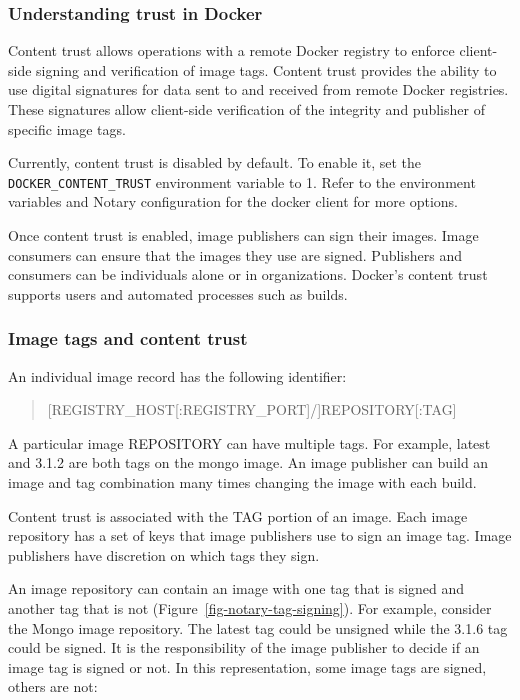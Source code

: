 \subsubsection{Understanding trust in Docker}
Content trust allows operations with a remote Docker registry to enforce
client-side signing and verification of image tags. Content trust provides
the ability to use digital signatures for data sent to and received from
remote Docker registries. These signatures allow client-side verification
of the integrity and publisher of specific image tags.

Currently, content trust is disabled by default. To enable it, set the
{\tt DOCKER\_CONTENT\_TRUST} environment variable to 1. Refer to the environment
variables and Notary configuration for the docker client for more options.

Once content trust is enabled, image publishers can sign their images.
Image consumers can ensure that the images they use are signed. Publishers
and consumers can be individuals alone or in organizations. Docker’s
content trust supports users and automated processes such as builds.

\subsubsection{Image tags and content trust}
An individual image record has the following identifier:

\begin{quote}
[REGISTRY\_HOST[:REGISTRY\_PORT]/]REPOSITORY[:TAG]
\end{quote}

A particular image REPOSITORY can have multiple tags. For example, latest
and 3.1.2 are both tags on the mongo image. An image publisher can build an
image and tag combination many times changing the image with each build.

Content trust is associated with the TAG portion of an image. Each image
repository has a set of keys that image publishers use to sign an image
tag. Image publishers have discretion on which tags they sign.

An image repository can contain an image with one tag that is signed and
another tag that is not (Figure~\ref{fig-notary-tag-signing}). For example, 
consider the Mongo image repository.
The latest tag could be unsigned while the 3.1.6 tag could be signed. It is
the responsibility of the image publisher to decide if an image tag is
signed or not. In this representation, some image tags are signed, others
are not:

